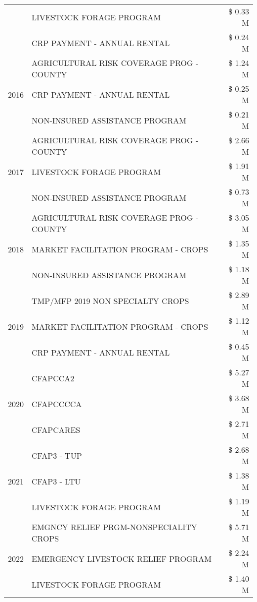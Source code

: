 \begin{tabular}{llr}
 & LIVESTOCK FORAGE PROGRAM & \$ 0.33 M \\
 & CRP PAYMENT - ANNUAL RENTAL & \$ 0.24 M \\
\cline{1-3}
\multirow[t]{3}{*}{2016} & AGRICULTURAL RISK COVERAGE PROG - COUNTY & \$ 1.24 M \\
 & CRP PAYMENT - ANNUAL RENTAL & \$ 0.25 M \\
 & NON-INSURED ASSISTANCE PROGRAM & \$ 0.21 M \\
\cline{1-3}
\multirow[t]{3}{*}{2017} & AGRICULTURAL RISK COVERAGE PROG - COUNTY & \$ 2.66 M \\
 & LIVESTOCK FORAGE PROGRAM & \$ 1.91 M \\
 & NON-INSURED ASSISTANCE PROGRAM & \$ 0.73 M \\
\cline{1-3}
\multirow[t]{3}{*}{2018} & AGRICULTURAL RISK COVERAGE PROG - COUNTY & \$ 3.05 M \\
 & MARKET FACILITATION PROGRAM - CROPS & \$ 1.35 M \\
 & NON-INSURED ASSISTANCE PROGRAM & \$ 1.18 M \\
\cline{1-3}
\multirow[t]{3}{*}{2019} & TMP/MFP 2019 NON SPECIALTY CROPS & \$ 2.89 M \\
 & MARKET FACILITATION PROGRAM - CROPS & \$ 1.12 M \\
 & CRP PAYMENT - ANNUAL RENTAL & \$ 0.45 M \\
\cline{1-3}
\multirow[t]{3}{*}{2020} & CFAPCCA2 & \$ 5.27 M \\
 & CFAPCCCCA & \$ 3.68 M \\
 & CFAPCARES & \$ 2.71 M \\
\cline{1-3}
\multirow[t]{3}{*}{2021} & CFAP3 - TUP & \$ 2.68 M \\
 & CFAP3 - LTU & \$ 1.38 M \\
 & LIVESTOCK FORAGE PROGRAM & \$ 1.19 M \\
\cline{1-3}
\multirow[t]{3}{*}{2022} & EMGNCY RELIEF PRGM-NONSPECIALITY CROPS & \$ 5.71 M \\
 & EMERGENCY LIVESTOCK RELIEF PROGRAM & \$ 2.24 M \\
 & LIVESTOCK FORAGE PROGRAM & \$ 1.40 M \\
\cline{1-3}
\bottomrule
\end{tabular}
